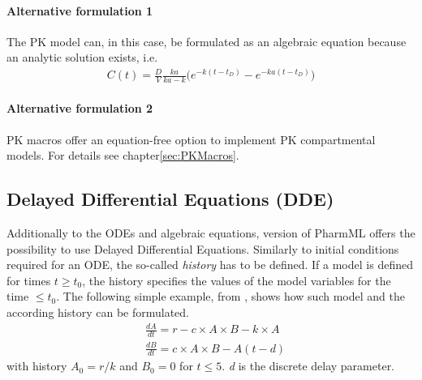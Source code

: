 \paragraph{Alternative formulation 1}
The PK model can, in this case, be formulated as an algebraic equation because an analytic solution exists, i.e.
\begin{align*}
C(t) = \frac{D}{V}  \frac{ka}{ka - k} \Big(e^{-k(t-t_D)} - e^{-ka(t-t_D)} \Big) 
\end{align*}

\paragraph{Alternative formulation 2}
PK macros offer an equation-free option to implement PK compartmental models.
For details see chapter\ref{sec:PKMacros}.

\subsection{Delayed Differential Equations (DDE)}
Additionally to the ODEs and algebraic equations, version \currpml of PharmML offers
the possibility to use Delayed Differential Equations. Similarly to initial conditions required
for an ODE, the so-called \emph{history} has to be defined. If a model is defined for times
$t \geq t_0$, the history specifies the values of the model variables for the 
time $\leq t_0$. 
The following simple example, from \cite{MLXTRANforMonolix:2014}, shows how 
such model and the according history can be formulated. 
\begin{align}
& \frac{dA}{dt} = r - c \times A \times B - k \times A \nonumber \\
& \frac{dB}{dt} = c \times A \times B - A(t-d) \nonumber 
\end{align}
with history $A_0 = r/k$ and $B_0 = 0$ for $t \le 5$. \emph{d} is the discrete delay parameter.

